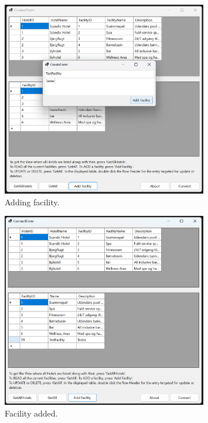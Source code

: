 \begin{figure}
    \centering
    \includegraphics[width=0.8\textwidth]{figures/app-screenshots/5addfacility.png}
    \caption{Adding facility.}
    \label{fig:5addfacility}
\end{figure}

\begin{figure}
    \centering
    \includegraphics[width=0.8\textwidth]{figures/app-screenshots/6facilityadded.png}
    \caption{Facility added.}
    \label{fig:6facilityadded}
\end{figure}

